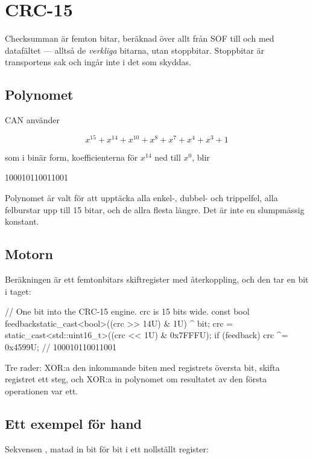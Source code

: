 \section{CRC-15}

Checksumman är femton bitar, beräknad över allt från SOF till och med datafältet --- alltså de
\emph{verkliga} bitarna, utan stoppbitar. Stoppbitar är transportens sak och ingår inte i det
som skyddas.

\subsection{Polynomet}

CAN använder

\[ x^{15} + x^{14} + x^{10} + x^{8} + x^{7} + x^{4} + x^{3} + 1 \]

som i binär form, koefficienterna för $x^{14}$ ned till $x^{0}$, blir

\begin{console}
100010110011001
\end{console}

Polynomet är valt för att upptäcka alla enkel-, dubbel- och trippelfel, alla felburstar upp till
15 bitar, och de allra flesta längre. Det är inte en slumpmässig konstant.

\subsection{Motorn}

Beräkningen är ett femtonbitars skiftregister med återkoppling, och den tar en bit i taget:

\begin{cppcode}
// One bit into the CRC-15 engine. crc is 15 bits wide.
const bool feedback{static_cast<bool>((crc >> 14U) & 1U) ^ bit};
crc = static_cast<std::uint16_t>((crc << 1U) & 0x7FFFU);
if (feedback)
{
    crc ^= 0x4599U;   // 100010110011001
}
\end{cppcode}

Tre rader: XOR:a den inkommande biten med registrets översta bit, skifta registret ett steg, och
XOR:a in polynomet om resultatet av den första operationen var ett.

\subsection{Ett exempel för hand}

Sekvensen , matad in bit för bit i ett nollställt register:


